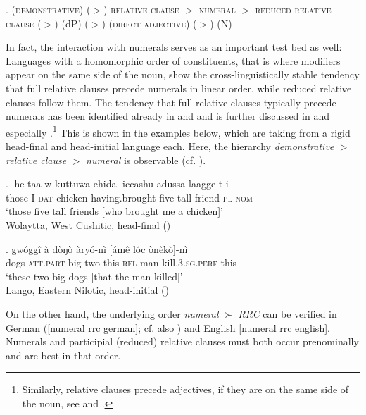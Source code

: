 \ex. (\textsc{demonstrative}) ($>$) \textsc{relative clause} $>$ \textsc{numeral} $>$ \textsc{reduced relative clause} ($>$) (dP) ($>$) (\textsc{direct adjective}) ($>$) (N)

In fact, the interaction with numerals serves as an important test bed as well: Languages with a homomorphic order of constituents, that is where modifiers appear on the same side of the noun, show the cross-linguistically stable tendency that full relative clauses precede numerals in linear order, while reduced relative clauses follow them. The tendency that full relative clauses typically precede numerals has been identified already in \citet{greenberg:1963:some} and \citet{hawkins:1983:word} and is further discussed in \citet{cinque:2005:deriving, cinque:2023:linearization} and especially \citet[§ 3.5]{cinque:2020:relcl}.\footnote{Similarly, relative clauses precede adjectives, if they are on the same side of the noun, see \citet{cinque:2005:deriving, cinque:2023:linearization} and \citet[298–299]{rijkhoff:2002:noun}.} This is shown in the examples below, which are taking from a rigid head-final and head-initial language each. Here, the hierarchy \textit{demonstrative} $>$ \textit{relative clause} $>$ \textit{numeral} is observable (cf. \citealt[225]{cinque:2020:relcl}).  

\exg. [he taa-w kuttuwa ehida] iccashu adussa laagge-t-i\\
those I-\textsc{dat} chicken having.brought five tall friend-\textsc{pl-nom}\\
`those five tall friends [who brought me a chicken]’ \\ \null \hfill Wolaytta, West Cushitic, head-final (\citealt[215]{lamberti:1997:wolyatta})

\exg. gwóggî à dòŋò àryó-nì [ámê lóc\textschwa {} ònèkò]-nì \\
dogs \textsc{att.part} big two-this \textsc{rel} man kill.\textsc{3.sg}.\textsc{perf}-this\\
`these two big dogs [that the man killed]’ \\ \null \hfill Lango, Eastern Nilotic, head-initial (\citealt[156]{noonan:1992:lango})

\largerpage
On the other hand, the underlying order \textit{numeral} $\succ$ \textit{RRC} can be verified in  German (\ref{numeral rrc german}; cf. also \citealt{eichinger:1991:ganz, trost:2006:das}) and English \ref{numeral rrc english}. Numerals and participial (reduced) relative clauses must both occur prenominally and are best in that order.

